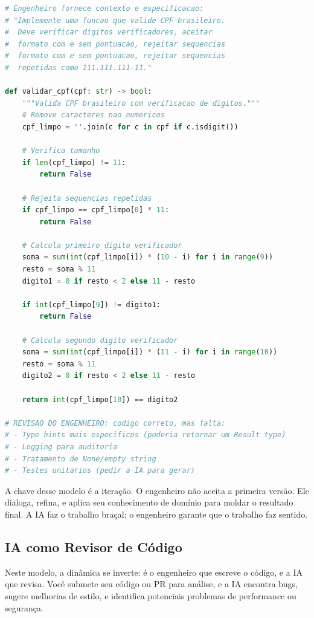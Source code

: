 \begin{lstlisting}[language=Python, caption={Exemplo de interação com IA como par programador}]
# Engenheiro fornece contexto e especificacao:
# "Implemente uma funcao que valide CPF brasileiro.
#  Deve verificar digitos verificadores, aceitar
#  formato com e sem pontuacao, rejeitar sequencias
#  formato com e sem pontuacao, rejeitar sequencias
#  repetidas como 111.111.111-11."

def validar_cpf(cpf: str) -> bool:
    """Valida CPF brasileiro com verificacao de digitos."""
    # Remove caracteres nao numericos
    cpf_limpo = ''.join(c for c in cpf if c.isdigit())

    # Verifica tamanho
    if len(cpf_limpo) != 11:
        return False

    # Rejeita sequencias repetidas
    if cpf_limpo == cpf_limpo[0] * 11:
        return False

    # Calcula primeiro digito verificador
    soma = sum(int(cpf_limpo[i]) * (10 - i) for i in range(9))
    resto = soma % 11
    digito1 = 0 if resto < 2 else 11 - resto

    if int(cpf_limpo[9]) != digito1:
        return False

    # Calcula segundo digito verificador
    soma = sum(int(cpf_limpo[i]) * (11 - i) for i in range(10))
    resto = soma % 11
    digito2 = 0 if resto < 2 else 11 - resto

    return int(cpf_limpo[10]) == digito2

# REVISAO DO ENGENHEIRO: codigo correto, mas falta:
# - Type hints mais especificos (poderia retornar um Result type)
# - Logging para auditoria
# - Tratamento de None/empty string
# - Testes unitarios (pedir a IA para gerar)
\end{lstlisting}

A chave desse modelo é a iteração. O engenheiro não aceita a primeira versão. Ele
dialoga, refina, e aplica seu conhecimento de domínio para moldar o resultado final.
A IA faz o trabalho braçal; o engenheiro garante que o trabalho faz sentido.

\subsection{IA como Revisor de Código}

Neste modelo, a dinâmica se inverte: é o engenheiro que escreve o código, e a IA que
revisa. Você submete seu código ou PR para análise, e a IA encontra bugs, sugere
melhorias de estilo, e identifica potenciais problemas de performance ou segurança.

